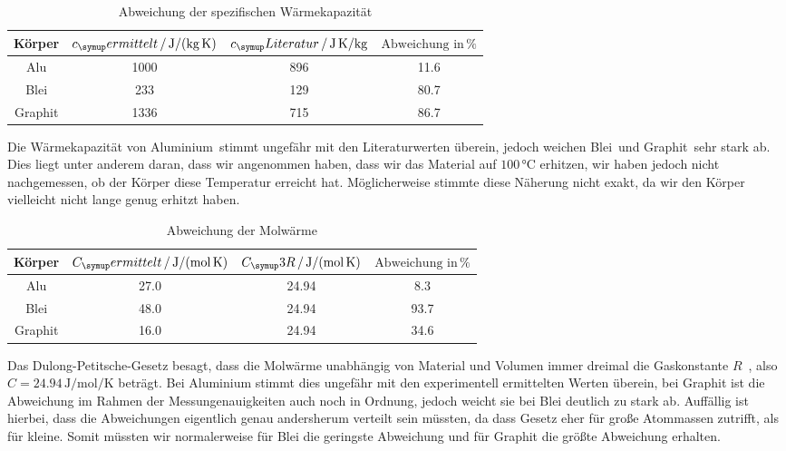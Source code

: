 \begin{table}
  \centering
  \begin{tabular}{c c c c}
    \toprule
    Körper & $c_\su{ermittelt}\,/\,\si{\joule\per\kilo\gram\per\kelvin}$ &
    $c_\su{Literatur}\,/\,\si{\joule\per\kilo\gram\kelvin}$\cite{bleialu} & $\text{Abweichung in}\,\%$ \\
    \midrule
    Alu & 1000 & 896 & 11.6 \\
    Blei & 233 & 129 & 80.7\\
    Graphit & 1336 & 715 & 86.7 \\
    \bottomrule
  \end{tabular}
  \caption{Abweichung der spezifischen Wärmekapazität}
\end{table}
Die Wärmekapazität von Aluminium\,\cite{bleilu} stimmt ungefähr mit den Literaturwerten überein,
jedoch weichen Blei\,\cite{bleialu} und Graphit\,\cite{graphit} sehr stark ab.
Dies liegt unter anderem daran,
dass wir angenommen haben, dass wir das Material auf $100\,\si{\celsius}$ erhitzen,
wir haben jedoch nicht nachgemessen, ob der Körper diese Temperatur erreicht hat.
Möglicherweise stimmte diese Näherung nicht exakt, da wir den Körper vielleicht
nicht lange genug erhitzt haben.

\begin{table}
  \centering
  \begin{tabular}{c c c c}
    \toprule
    Körper & $C_\su{ermittelt}\,/\,\si{\joule\per\mol\per\kelvin}$ &
    $C_\su{3R}\,/\,\si{\joule\per\mol\per\kelvin}$ & $\text{Abweichung in} \,\%$ \\
    \midrule
    Alu & 27.0 & 24.94 & 8.3 \\
    Blei & 48.0 & 24.94 & 93.7 \\
    Graphit & 16.0 & 24.94 & 34.6 \\
    \bottomrule
  \end{tabular}
  \caption{Abweichung der Molwärme}
\end{table}
Das Dulong-Petitsche-Gesetz besagt, dass die Molwärme unabhängig von Material und
Volumen immer dreimal die Gaskonstante $R$ \,\cite{chemie}, also
$ C = 24.94 \,\si{\joule\per\mol\per\kelvin}$
beträgt. Bei Aluminium stimmt dies ungefähr mit den experimentell
ermittelten Werten überein, bei Graphit ist die Abweichung im Rahmen der Messungenauigkeiten
auch noch in Ordnung, jedoch weicht sie bei Blei deutlich zu stark ab. Auffällig ist hierbei,
dass die Abweichungen eigentlich genau andersherum verteilt sein müssten, da dass Gesetz
eher für große Atommassen zutrifft, als für kleine. Somit müssten wir normalerweise für Blei
die geringste Abweichung und für Graphit die größte Abweichung erhalten.
